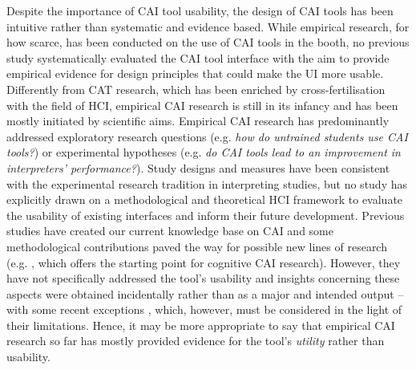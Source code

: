 Despite the importance of CAI tool usability, the design of CAI tools has been intuitive rather than systematic and evidence based. While empirical research, for how scarce, has been conducted on the use of CAI tools in the booth, no previous study systematically evaluated the CAI tool interface with the aim to provide empirical evidence for design principles that could make the UI more usable. Differently from CAT research, which has been enriched by cross-fertilisation with the field of HCI, empirical CAI research is still in its infancy and has been mostly initiated by scientific aims. Empirical CAI research has predominantly addressed exploratory research questions (e.g. \textit{how do untrained students use CAI tools?}) or experimental hypotheses (e.g. \textit{do CAI tools lead to an improvement in interpreters’ performance?}). Study designs and measures have been consistent with the experimental research tradition in interpreting studies, but no study has explicitly drawn on a methodological and theoretical HCI framework to evaluate the usability of existing interfaces and inform their future development. Previous studies have created our current knowledge base on CAI and some methodological contributions paved the way for possible new lines of research (e.g. \cite{prandi2022a}, which offers the starting point for cognitive CAI research). However, they have not specifically addressed the tool’s usability and insights concerning these aspects were obtained incidentally rather than as a major and intended output -- with some recent exceptions \citep{montecchio2021,eabm2021b}, which, however, must be considered in the light of their limitations. Hence, it may be more appropriate to say that empirical CAI research so far has mostly provided evidence for the tool’s \textit{utility} rather than usability.

